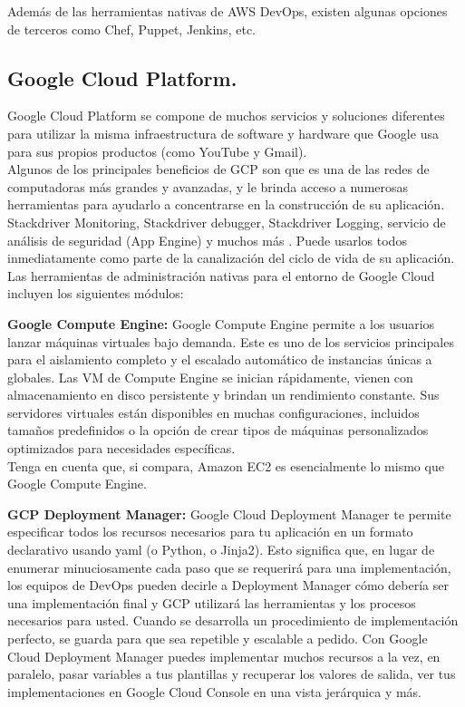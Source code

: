 \documentclass[11pt]{article}
\begin{document}
Además de las herramientas nativas de AWS DevOps, existen algunas opciones de terceros como Chef, Puppet, Jenkins, etc.\\

\subsection{Google Cloud Platform.}
Google Cloud Platform se compone de muchos servicios y soluciones diferentes para utilizar la misma infraestructura de software y hardware que Google usa para sus propios productos (como YouTube y Gmail).\\
Algunos de los principales beneficios de GCP son que es una de las redes de computadoras más grandes y avanzadas, y le brinda acceso a numerosas herramientas para ayudarlo a concentrarse en la construcción de su aplicación. Stackdriver Monitoring, Stackdriver debugger, Stackdriver Logging, servicio de análisis de seguridad (App Engine) y muchos más . Puede usarlos todos inmediatamente como parte de la canalización del ciclo de vida de su aplicación.\\

Las herramientas de administración nativas para el entorno de Google Cloud incluyen los siguientes módulos:\\
\item \textbf{Google Compute Engine:} Google Compute Engine permite a los usuarios lanzar máquinas virtuales bajo demanda. Este es uno de los servicios principales para el aislamiento completo y el escalado automático de instancias únicas a globales. Las VM de Compute Engine se inician rápidamente, vienen con almacenamiento en disco persistente y brindan un rendimiento constante. Sus servidores virtuales están disponibles en muchas configuraciones, incluidos tamaños predefinidos o la opción de crear tipos de máquinas personalizados optimizados para necesidades específicas.\\

Tenga en cuenta que, si compara, Amazon EC2 es esencialmente lo mismo que Google Compute Engine.

\item \textbf{GCP Deployment Manager:} Google Cloud Deployment Manager te permite especificar todos los recursos necesarios para tu aplicación en un formato declarativo usando yaml (o Python, o Jinja2). Esto significa que, en lugar de enumerar minuciosamente cada paso que se requerirá para una implementación, los equipos de DevOps pueden decirle a Deployment Manager cómo debería ser una implementación final y GCP utilizará las herramientas y los procesos necesarios para usted. Cuando se desarrolla un procedimiento de implementación perfecto, se guarda para que sea repetible y escalable a pedido. Con Google Cloud Deployment Manager puedes implementar muchos recursos a la vez, en paralelo, pasar variables a tus plantillas y recuperar los valores de salida, ver tus implementaciones en Google Cloud Console en una vista jerárquica y más.
\end{document}
